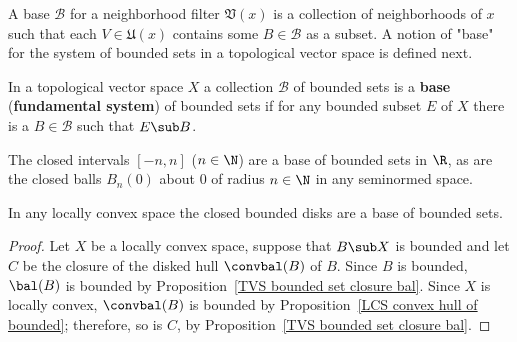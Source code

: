 A base $\mathcal{B}$ for a neighborhood filter $\mathfrak{V}(x)$ is a collection of neighborhoods of $x$ such that each $V\in\mathfrak{U}(x)$ contains some $B\in\mathcal{B}$ as a subset. A notion of "base" for the system of bounded sets in a topological vector space is defined next.
\begin{definition}
In a topological vector space $X$ a collection $\mathcal{B}$ of bounded sets is a \textbf{base} (\textbf{fundamental system}) of bounded sets if for any bounded subset $E$ of $X$ there is a $B\in\mathcal{B}$ such that $E\sub B$.
\end{definition}
The closed intervals $[-n,n]$ ($n\in\N$) are a base of bounded sets in $\R$, as are the closed balls $B_n(0)$ about $0$ of radius $n\in\N$ in any seminormed space.
\begin{proposition}\label{LCS bounded base}
In any locally convex space the closed bounded disks are a base of bounded sets.
\end{proposition}
\begin{proof}
Let $X$ be a locally convex space, suppose that $B\sub X$ is bounded and let $C$ be the closure of the disked hull $\convbal(B)$ of $B$. Since $B$ is bounded, $\bal(B)$ is bounded by Proposition~\ref{TVS bounded set closure bal}. Since $X$ is locally convex, $\convbal(B)$ is bounded by Proposition~\ref{LCS convex hull of bounded}; therefore, so is $C$, by Proposition~\ref{TVS bounded set closure bal}.
\end{proof}
